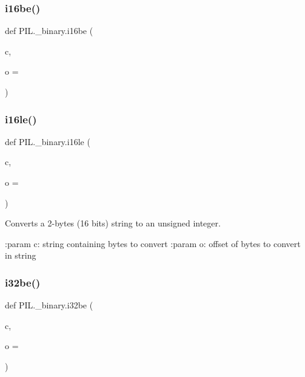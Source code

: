 \subsubsection{\texorpdfstring{i16be()}{i16be()}}
{\footnotesize\ttfamily def P\+I\+L.\+\_\+binary.\+i16be (\begin{DoxyParamCaption}\item[{}]{c,  }\item[{}]{o = {} }\end{DoxyParamCaption})}

\mbox{\label{namespacePIL_1_1__binary_ad1b106d34378ca88022873d60e3b7762}} 
\subsubsection{\texorpdfstring{i16le()}{i16le()}}
{\footnotesize\ttfamily def P\+I\+L.\+\_\+binary.\+i16le (\begin{DoxyParamCaption}\item[{}]{c,  }\item[{}]{o = {} }\end{DoxyParamCaption})}

\begin{DoxyVerb}Converts a 2-bytes (16 bits) string to an unsigned integer.

:param c: string containing bytes to convert
:param o: offset of bytes to convert in string
\end{DoxyVerb}
 \mbox{\label{namespacePIL_1_1__binary_a6f4c8b2d2404e7b85a9843e80ddffb1c}} 
\subsubsection{\texorpdfstring{i32be()}{i32be()}}
{\footnotesize\ttfamily def P\+I\+L.\+\_\+binary.\+i32be (\begin{DoxyParamCaption}\item[{}]{c,  }\item[{}]{o = {} }\end{DoxyParamCaption})}

\mbox{\label{namespacePIL_1_1__binary_a9eda87cd27cce462fdb53c50150db6bd}} 
